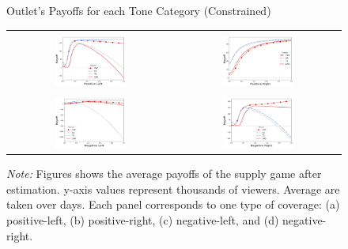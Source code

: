 \documentclass[12pt]{article}
\begin{document}
	
	
		\begin{figure}[!htb]
		\caption{Outlet's Payoffs for each Tone Category (Constrained)}
		\centering
		\begin{tabular}{@{}cc@{}}
			\text{(a) Positive Left } &
			\text{(b) Positive Right} \\[0.08em]
			\includegraphics[width=0.45\textwidth]{figures/payoff_pos_left_all_positive} &
			\includegraphics[width=0.45\textwidth]{figures/payoff_pos_right_all_positive} \\[1em]
			\text{(c) Negative Left} &
			\text{(d) Negative Right} \\[0.08em]
			\includegraphics[width=0.45\textwidth]{figures/payoff_neg_left_all_positive} &
			\includegraphics[width=0.45\textwidth]{figures/payoff_neg_right_all_positive}
		\end{tabular}
		\caption*{\small \textit{Note:} Figures shows the average payoffs of the supply game after estimation. y-axis values represent thousands of viewers. Average are taken over days. Each panel corresponds to one type of coverage: 
			(a) positive-left, (b) positive-right, (c) negative-left, and (d) negative-right.}
		\label{fig:payoffs_constrained}
	\end{figure}
	
\end{document}
